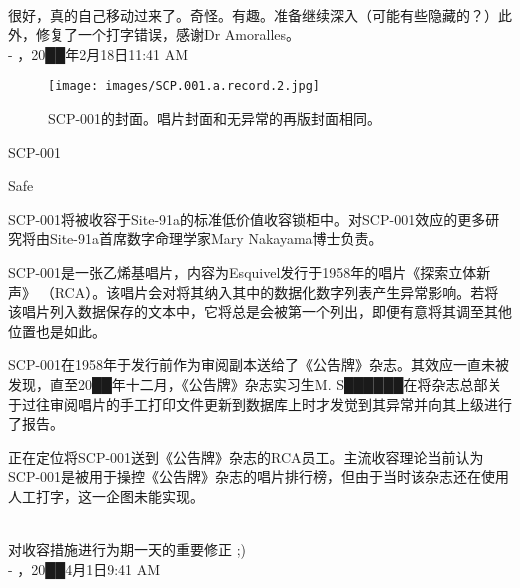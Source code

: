 
\begin{scpbox}
 \\
很好，真的自己移动过来了。奇怪。有趣。准备继续深入（可能有些隐藏的？）此外，修复了一个打字错误，感谢Dr Amoralles。 \\
- ，20██年2月18日11:41 AM
\end{scpbox}

\begin{figure}[H]
	\centering
	\texttt{[image: images/SCP.001.a.record.2.jpg]}
	\caption*{SCP-001的封面。唱片封面和无异常的再版封面相同。}
\end{figure}

SCP-001

Safe

SCP-001将被收容于Site-91a的标准低价值收容锁柜中。对SCP-001效应的更多研究将由Site-91a首席数字命理学家Mary Nakayama博士负责。

SCP-001是一张乙烯基唱片，内容为Esquivel发行于1958年的唱片《探索立体新声》 （RCA）。该唱片会对将其纳入其中的数据化数字列表产生异常影响。若将该唱片列入数据保存的文本中，它将总是会被第一个列出，即便有意将其调至其他位置也是如此。

SCP-001在1958年于发行前作为审阅副本送给了《公告牌》杂志。其效应一直未被发现，直至20██年十二月，《公告牌》杂志实习生M. S██████在将杂志总部关于过往审阅唱片的手工打印文件更新到数据库上时才发觉到其异常并向其上级进行了报告。

正在定位将SCP-001送到《公告牌》杂志的RCA员工。主流收容理论当前认为SCP-001是被用于操控《公告牌》杂志的唱片排行榜，但由于当时该杂志还在使用人工打字，这一企图未能实现。


\newpage



\begin{scpbox}
 \\
对收容措施进行为期一天的重要修正 ;) \\
- ，20██4月1日9:41 AM
\end{scpbox}

